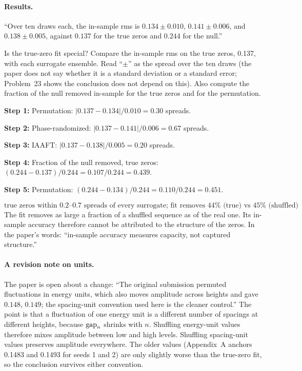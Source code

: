 \paragraph{Results.} ``Over ten draws each, the in-sample rms is $0.134\pm0.010$, $0.141\pm0.006$, and $0.138\pm0.005$, against $0.137$ for the true zeros and $0.244$ for the null.''

\begin{sample}{Is the true-zero fit special?}
Compare the in-sample rms on the true zeros, 0.137, with each surrogate ensemble. Read ``$\pm$'' as the spread over the ten draws (the paper does not say whether it is a standard deviation or a standard error; Problem~23 shows the conclusion does not depend on this). Also compute the fraction of the null removed in-sample for the true zeros and for the permutation.

\textbf{Step 1:} Permutation: $|0.137-0.134|/0.010=0.30$ spreads.

\textbf{Step 2:} Phase-randomized: $|0.137-0.141|/0.006=0.67$ spreads.

\textbf{Step 3:} IAAFT: $|0.137-0.138|/0.005=0.20$ spreads.

\textbf{Step 4:} Fraction of the null removed, true zeros: $(0.244-0.137)/0.244=0.107/0.244=0.439$.

\textbf{Step 5:} Permutation: $(0.244-0.134)/0.244=0.110/0.244=0.451$.

\[
\boxed{\text{true zeros within }0.2\text{--}0.7\text{ spreads of every surrogate;\ fit removes }44\%\text{ (true) vs }45\%\text{ (shuffled)}}
\]
The fit removes as large a fraction of a shuffled sequence as of the real one. Its in-sample accuracy therefore cannot be attributed to the structure of the zeros. In the paper's words: ``in-sample accuracy measures capacity, not captured structure.''
\end{sample}

\paragraph{A revision note on units.} The paper is open about a change: ``The original submission permuted fluctuations in energy units, which also moves amplitude across heights and gave $0.148$, $0.149$; the spacing-unit convention used here is the cleaner control.'' The point is that a fluctuation of one energy unit is a different number of spacings at different heights, because $\mathrm{gap}_n$ shrinks with $n$. Shuffling energy-unit values therefore mixes amplitude between low and high levels. Shuffling spacing-unit values preserves amplitude everywhere. The older values (Appendix~A anchors 0.1483 and 0.1493 for seeds 1 and 2) are only slightly worse than the true-zero fit, so the conclusion survives either convention.

